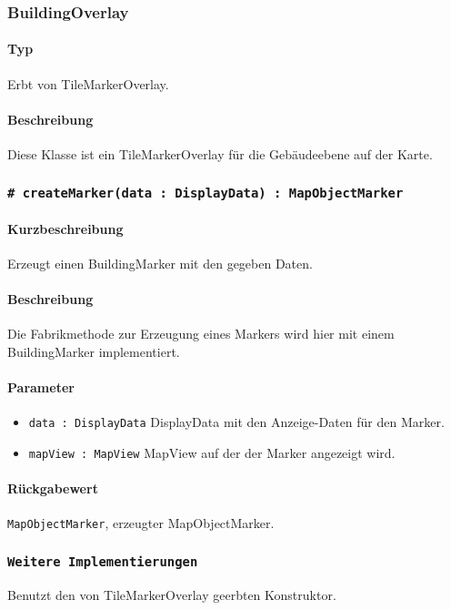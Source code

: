\subsubsection{BuildingOverlay}
\paragraph*{Typ}
Erbt von TileMarkerOverlay.
\paragraph*{Beschreibung}
Diese Klasse ist ein TileMarkerOverlay für die Gebäudeebene auf der Karte.

\subsubsection*{\texttt{\# createMarker(data : DisplayData) : MapObjectMarker}}%
\paragraph*{Kurzbeschreibung}
Erzeugt einen BuildingMarker mit den gegeben Daten.
\paragraph*{Beschreibung}
Die Fabrikmethode zur Erzeugung eines Markers wird hier mit einem BuildingMarker implementiert.
\paragraph*{Parameter}
\begin{itemize}
    \item \texttt{data : DisplayData} DisplayData mit den Anzeige-Daten für den Marker.
    \item \texttt{mapView : MapView} MapView auf der der Marker angezeigt wird.
\end{itemize}
\paragraph*{Rückgabewert}
\texttt{MapObjectMarker}, erzeugter MapObjectMarker.

\subsubsection*{\texttt{Weitere Implementierungen}}%
Benutzt den von TileMarkerOverlay geerbten Konstruktor.

